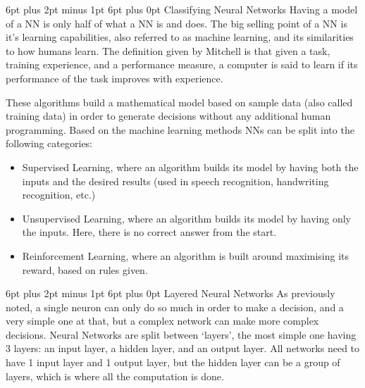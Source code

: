 \documentclass[12pt,a4paper]{article}
\makeatletter
\renewcommand\subsection{\@startsection {subsection}{1}{2mm} %
                               {6pt plus 2pt minus 1pt} %
                               {6pt plus 0pt} %
                               {\normalfont\bfseries}}
\makeatother
\begin{document}
\subsection{Classifying Neural Networks}
Having a model of a NN is only half of what a NN is and does. The big selling point of a NN is it’s learning capabilities, also referred to as machine learning, and its similarities to how humans learn. The definition given by Mitchell \cite{mitchell_explanation-based_1993} is that given a task, training experience, and a performance measure, a computer is said to learn if its performance of the task improves with experience.\cite{thrun_learning_2012}\par
These algorithms build a mathematical model based on sample data (also called training data) in order to generate decisions without any additional human programming. Based on the machine learning methods NNs can be split into the following categories:
\begin{itemize}
	\item Supervised Learning, where an algorithm builds its model by having both the inputs and the desired results (used in speech recognition, handwriting recognition, etc.)
	\item Unsupervised Learning, where an algorithm builds its model by having only the inputs. Here, there is no correct answer from the start.
	\item Reinforcement Learning, where an algorithm is built around maximising its reward, based on rules given.
\end{itemize}


\subsection{Layered Neural Networks}
As previously noted, a single neuron can only do so much in order to make a decision, and a very simple one at that, but a complex network can make more complex decisions. Neural Networks are split between ‘layers’, the most simple one having 3 layers: an input layer, a hidden layer, and an output layer. All networks need to have 1 input layer and 1 output layer, but the hidden layer can be a group of layers, which is where all the computation is done.
\end{document}
